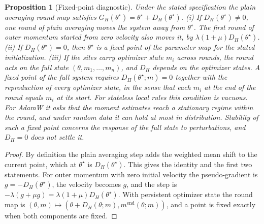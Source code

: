 \documentclass[11pt]{article}
\newtheorem{proposition}{Proposition}
\theoremstyle{definition}
\theoremstyle{remark}
\begin{document}
\begin{proposition}[Fixed-point diagnostic]\label{prop:diagnostic}
Under the stated specification the plain averaging round map satisfies $G_H(\theta^\star)=\theta^\star+D_H(\theta^\star)$.
(i) If $D_H(\theta^\star)\neq0$, one round of plain averaging moves the system away from $\theta^\star$. The first round of outer momentum started from zero velocity also moves it, by $\lambda(1+\mu)D_H(\theta^\star)$. (ii) If $D_H(\theta^\star)=0$, then $\theta^\star$ is a fixed point of the parameter map for the stated initialization. (iii) If the sites carry optimizer state $m_i$ across rounds, the round acts on the full state $(\theta,m_1,\dots,m_n)$, and $D_H$ depends on the optimizer states. A fixed point of the full system requires $D_H(\theta^\star;m)=0$ together with the reproduction of every optimizer state, in the sense that each $m_i$ at the end of the round equals $m_i$ at its start. For stateless local rules this condition is vacuous. For AdamW it asks that the moment estimates reach a stationary regime within the round, and under random data it can hold at most in distribution. Stability of such a fixed point concerns the response of the full state to perturbations, and $D_H=0$ does not settle it.
\end{proposition}

\begin{proof}
By definition the plain averaging step adds the weighted mean shift to the current point, which at $\theta^\star$ is $D_H(\theta^\star)$. This gives the identity and the first two statements. For outer momentum with zero initial velocity the pseudo-gradient is $g=-D_H(\theta^\star)$, the velocity becomes $g$, and the step is $-\lambda(g+\mu g)=\lambda(1+\mu)D_H(\theta^\star)$. With persistent optimizer state the round map is $(\theta,m)\mapsto(\theta+D_H(\theta;m),m^{\mathrm{end}}(\theta;m))$, and a point is fixed exactly when both components are fixed.
\end{proof}
\end{document}

